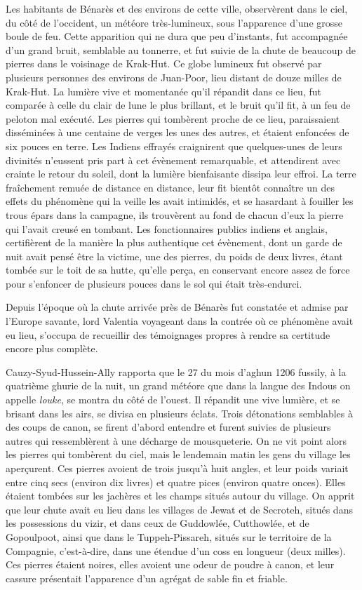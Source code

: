 \documentclass[a4paper, 12pt, oneside, french]{article}
\begin{document}
Les habitants de Bénarès et des environs de cette ville, observèrent dans le ciel, du côté de l'occident, un météore très-lumineux, sous l'apparence d'une grosse boule de feu. Cette apparition qui ne dura que peu d'instants, fut accompagnée d'un grand bruit, semblable au tonnerre, et fut suivie de la chute de beaucoup de pierres dans le voisinage de Krak-Hut. Ce globe lumineux fut observé par plusieurs personnes des environs de Juan-Poor, lieu distant de douze milles de Krak-Hut. La lumière vive et momentanée qu'il répandit dans ce lieu, fut comparée à celle du clair de lune le plus brillant, et le bruit qu'il fit, à un feu de peloton mal exécuté. Les pierres qui tombèrent proche de ce lieu, paraissaient disséminées à une centaine de verges les unes des autres, et étaient enfoncées de six pouces en terre. Les Indiens effrayés craignirent que quelques-unes de leurs divinités n'eussent pris part à cet évènement remarquable, et attendirent avec crainte le retour du soleil, dont la lumière bienfaisante dissipa leur effroi. La terre fraîchement remuée de distance en distance, leur fit bientôt connaître un des effets du phénomène qui la veille les avait intimidés, et se hasardant à fouiller les trous épars dans la campagne, ils trouvèrent au fond de chacun d'eux la pierre qui l'avait creusé en tombant. Les fonctionnaires publics indiens et anglais, certifièrent de la manière la plus authentique cet évènement, dont un garde de nuit avait pensé être la victime, une des pierres, du poids de deux livres, étant tombée sur le toit de sa hutte, qu'elle perça, en conservant encore assez de force pour s'enfoncer de plusieurs pouces dans le sol qui était très-endurci.

Depuis l'époque où la chute arrivée près de Bénarès fut constatée et admise par l'Europe savante, lord Valentia voyageant dans la contrée où ce phénomène avait eu lieu, s'occupa de recueillir des témoignages propres à rendre sa certitude encore plus complète.

Cauzy-Syud-Hussein-Ally rapporta que le 27 du mois d'aghun 1206 fussily, à la quatrième ghurie de la nuit, un grand météore que dans la langue des Indous on appelle \emph{louke}, se montra du côté de l'ouest. Il répandit une vive lumière, et se brisant dans les airs, se divisa en plusieurs éclats. Trois détonations semblables à des coups de canon, se firent d'abord entendre et furent suivies de plusieurs autres qui ressemblèrent à une décharge de mousqueterie. On ne vit point alors les pierres qui tombèrent du ciel, mais le lendemain matin les gens du village les aperçurent. Ces pierres avoient de trois jusqu'à huit angles, et leur poids variait entre cinq secs (environ dix livres) et quatre pices (environ quatre onces). Elles étaient tombées sur les jachères et les champs situés autour du village. On apprit que leur chute avait eu lieu dans les villages de Jewat et de Secroteh, situés dans les possessions du vizir, et dans ceux de Guddowlée, Cutthowlée, et de Gopoulpoot, ainsi que dans le Tuppeh-Pissareh, situés sur le territoire de la Compagnie, c'est-à-dire, dans une étendue d'un coss en longueur (deux milles). Ces pierres étaient noires, elles avoient une odeur de poudre à canon, et leur cassure présentait l'apparence d'un agrégat de sable fin et friable.
\end{document}
